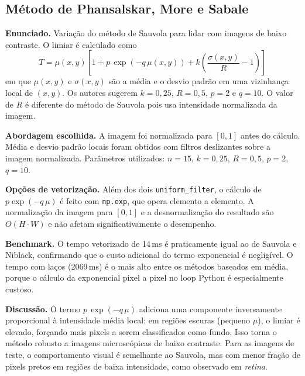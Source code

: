 \documentclass[12pt,a4paper]{article}
\newcommand{\campo}[2]{\textbf{#1.} #2\par}
\begin{document}
\subsection{Método de Phansalskar, More e Sabale \cite{phansalskar2011}}

\campo{Enunciado}{Variação do método de Sauvola para lidar com imagens de baixo contraste.
O limiar é calculado como
\begin{equation}
  T = \mu(x,y) \left[1 + p\,\exp(-q\,\mu(x,y)) + k \left(\frac{\sigma(x,y)}{R} - 1\right)\right]
\end{equation}
em que $\mu(x,y)$ e $\sigma(x,y)$ são a média e o desvio padrão em uma vizinhança local de
$(x,y)$. Os autores sugerem $k = 0{,}25$, $R = 0{,}5$, $p = 2$ e $q = 10$. O valor de $R$
é diferente do método de Sauvola pois usa intensidade normalizada da imagem.}

\campo{Abordagem escolhida}{A imagem foi normalizada para $[0,1]$ antes do cálculo. Média e
desvio padrão locais foram obtidos com filtros deslizantes sobre a imagem normalizada.
Parâmetros utilizados: $n = 15$, $k = 0{,}25$, $R = 0{,}5$, $p = 2$, $q = 10$.}

\campo{Opções de vetorização}{Além dos dois \texttt{uniform\_filter}, o cálculo de
$p \exp(-q\,\mu)$ é feito com \texttt{np.exp}, que opera elemento a elemento. A
normalização da imagem para $[0,1]$ e a desnormalização do resultado são
$O(H \cdot W)$ e não afetam significativamente o desempenho.}

\campo{Benchmark}{O tempo vetorizado de 14\,ms é praticamente igual ao de Sauvola e
Niblack, confirmando que o custo adicional do termo exponencial é negligível. O tempo
com laços (2069\,ms) é o mais alto entre os métodos baseados em média, porque o cálculo
da exponencial pixel a pixel no loop Python é especialmente custoso.}

\campo{Discussão}{O termo $p\,\exp(-q\,\mu)$ adiciona uma componente inversamente proporcional
à intensidade média local: em regiões escuras (pequeno $\mu$), o limiar é elevado,
forçando mais pixels a serem classificados como fundo. Isso torna o método robusto a
imagens microscópicas de baixo contraste. Para as imagens de teste, o comportamento visual
é semelhante ao Sauvola, mas com menor fração de pixels pretos em regiões de baixa
intensidade, como observado em \textit{retina}.}
\end{document}
